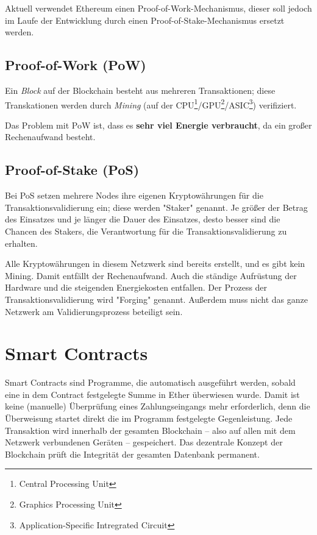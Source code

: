 Aktuell verwendet Ethereum einen Proof-of-Work-Mechanismus, dieser soll jedoch im Laufe der Entwicklung durch einen Proof-of-Stake-Mechanismus ersetzt werden.

\subsection{Proof-of-Work (PoW)} \label{l_mining}
Ein \textit{Block} auf der Blockchain besteht aus mehreren Transaktionen; diese Transkationen werden durch \textit{Mining} (auf der CPU\footnote{Central Processing Unit}/GPU\footnote{Graphics Processing Unit}/ASIC\footnote{Application-Specific Intregrated Circuit}) verifiziert.

Das Problem mit PoW ist, dass es \textbf{sehr viel Energie verbraucht}, da ein großer Rechenaufwand besteht.

\subsection{Proof-of-Stake (PoS)}
Bei PoS setzen mehrere Nodes ihre eigenen Kryptowährungen für die Transaktionsvalidierung ein; diese werden "Staker" genannt. Je größer der Betrag des Einsatzes und je länger die Dauer des Einsatzes, desto besser sind die Chancen des Stakers, die Verantwortung für die Transaktionsvalidierung zu erhalten.

Alle Kryptowährungen in diesem Netzwerk sind bereits erstellt, und es gibt kein Mining. Damit entfällt der Rechenaufwand. Auch die ständige Aufrüstung der Hardware und die steigenden Energiekosten entfallen. Der Prozess der Transaktionsvalidierung wird "Forging" genannt. Außerdem muss nicht das ganze Netzwerk am Validierungsprozess beteiligt sein.


\cite[vgl. Medium, PoW vs PoS]{PoW_vs_PoS}


\section{Smart Contracts}\label{l_smart_contracts}
Smart Contracts sind Programme, die automatisch ausgeführt werden, sobald eine in dem Contract festgelegte Summe in Ether überwiesen wurde. Damit ist keine (manuelle) Überprüfung eines Zahlungseingangs mehr erforderlich, denn die Überweisung startet direkt die im Programm festgelegte Gegenleistung.
Jede Transaktion wird innerhalb der gesamten Blockchain -- also auf allen mit dem Netzwerk verbundenen Geräten -- gespeichert. Das dezentrale Konzept der Blockchain prüft die Integrität der gesamten Datenbank permanent.

